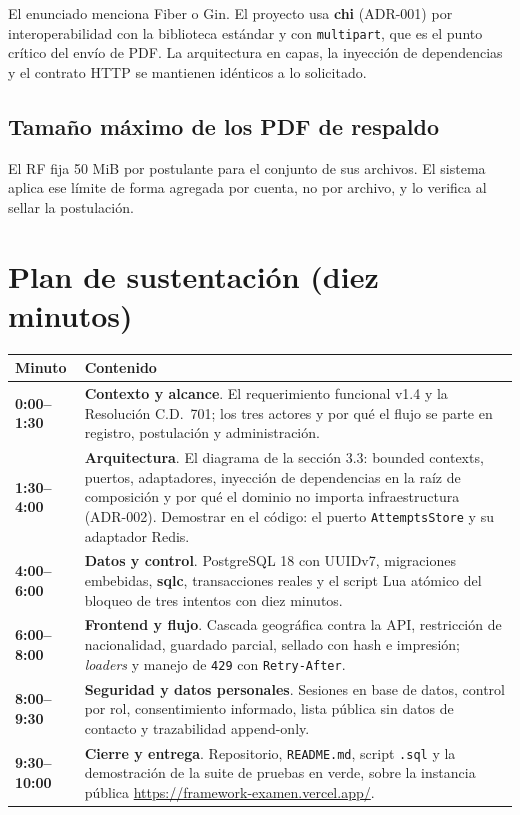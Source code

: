 \documentclass[11pt,a4paper]{article}
\newcommand{\ent}[1]{\textsf{\textbf{#1}}}
\newcommand{\code}[1]{\texttt{#1}}
\begin{document}
El enunciado menciona Fiber o Gin. El proyecto usa \ent{chi} (ADR-001) por interoperabilidad con la
biblioteca est\'andar y con \code{multipart}, que es el punto cr\'itico del env\'io de PDF. La arquitectura
en capas, la inyecci\'on de dependencias y el contrato HTTP se mantienen id\'enticos a lo solicitado.

\subsection{Tama\~no m\'aximo de los PDF de respaldo}

El RF fija 50 MiB por postulante para el conjunto de sus archivos. El sistema aplica ese l\'imite de forma
agregada por cuenta, no por archivo, y lo verifica al sellar la postulaci\'on.

\section{Plan de sustentaci\'on (diez minutos)}\label{sec:plan-demo}

\begin{center}
\small
\begin{tabularx}{\textwidth}{@{}>{\bfseries\color{upseAzul}}p{2.1cm} X@{}}
\toprule
Minuto & Contenido \\
\midrule
0:00--1:30 & \textbf{Contexto y alcance}. El requerimiento funcional v1.4 y la Resoluci\'on C.D.\ 701;
los tres actores y por qu\'e el flujo se parte en registro, postulaci\'on y administraci\'on. \\
1:30--4:00 & \textbf{Arquitectura}. El diagrama de la secci\'on 3.3: bounded contexts, puertos,
adaptadores, inyecci\'on de dependencias en la ra\'iz de composici\'on y por qu\'e el dominio no importa
infraestructura (ADR-002). Demostrar en el c\'odigo: el puerto \code{AttemptsStore} y su adaptador Redis. \\
4:00--6:00 & \textbf{Datos y control}. PostgreSQL 18 con UUIDv7, migraciones embebidas, \ent{sqlc},
transacciones reales y el script Lua at\'omico del bloqueo de tres intentos con diez minutos. \\
6:00--8:00 & \textbf{Frontend y flujo}. Cascada geogr\'afica contra la API, restricci\'on de nacionalidad,
guardado parcial, sellado con hash e impresi\'on; \emph{loaders} y manejo de \code{429} con
\code{Retry-After}. \\
8:00--9:30 & \textbf{Seguridad y datos personales}. Sesiones en base de datos, control por rol,
consentimiento informado, lista p\'ublica sin datos de contacto y trazabilidad append-only. \\
9:30--10:00 & \textbf{Cierre y entrega}. Repositorio, \code{README.md}, script \code{.sql} y la
demostraci\'on de la suite de pruebas en verde, sobre la instancia p\'ublica
\url{https://framework-examen.vercel.app/}. \\
\bottomrule
\end{tabularx}
\end{center}
\end{document}
